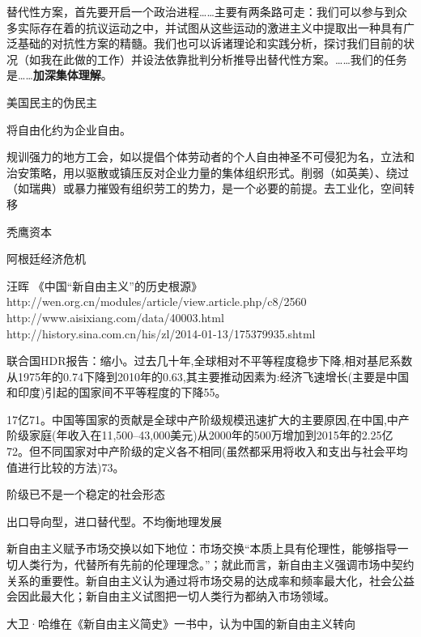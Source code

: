 替代性方案，首先要开启一个政治进程……主要有两条路可走：我们可以参与到众多实际存在着的抗议运动之中，并试图从这些运动的激进主义中提取出一种具有广泛基础的对抗性方案的精髓。我们也可以诉诸理论和实践分析，探讨我们目前的状况（如我在此做的工作）并设法依靠批判分析推导出替代性方案。……我们的任务是……\textbf{加深集体理解}。

美国民主的伪民主 




















将自由化约为企业自由。

规训强力的地方工会，如以提倡个体劳动者的个人自由神圣不可侵犯为名，立法和治安策略，用以驱散或镇压反对企业力量的集体组织形式。削弱（如英美）、绕过（如瑞典）或暴力摧毁有组织劳工的势力，是一个必要的前提。去工业化，空间转移

秃鹰资本

阿根廷经济危机


汪晖 《中国“新自由主义”的历史根源》http://wen.org.cn/modules/article/view.article.php/c8/2560 http://www.aisixiang.com/data/40003.html http://history.sina.com.cn/his/zl/2014-01-13/175379935.shtml


联合国HDR报告：缩小。过去几十年,全球相对不平等程度稳步下降,相对基尼系数从1975年的0.74下降到2010年的0.63,其主要推动因素为:经济飞速增长(主要是中国和印度)引起的国家间不平等程度的下降55。

 17亿71。中国等国家的贡献是全球中产阶级规模迅速扩大的主要原因,在中国,中产阶级家庭(年收入在11,500–43,000美元)从2000年的500万增加到2015年的2.25亿72。但不同国家对中产阶级的定义各不相同(虽然都采用将收入和支出与社会平均值进行比较的方法)73。

阶级已不是一个稳定的社会形态



出口导向型，进口替代型。不均衡地理发展


新自由主义赋予市场交换以如下地位：市场交换“本质上具有伦理性，能够指导一切人类行为，代替所有先前的伦理理念。”；就此而言，新自由主义强调市场中契约关系的重要性。新自由主义认为通过将市场交易的达成率和频率最大化，社会公益会因此最大化；新自由主义试图把一切人类行为都纳入市场领域。


大卫·哈维在《新自由主义简史》一书中，认为中国的新自由主义转向


